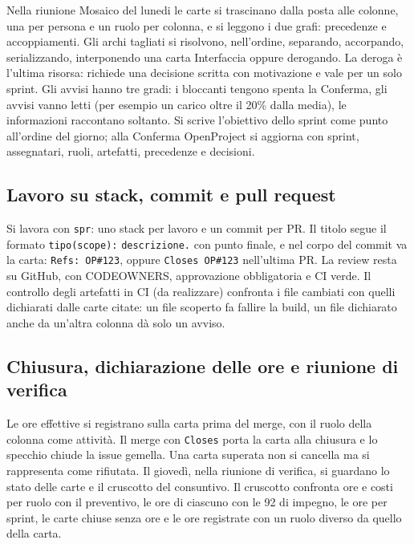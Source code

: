 \documentclass[a4paper, 11pt]{article}
\begin{document}
Nella riunione Mosaico del lunedi le carte si trascinano dalla posta alle colonne, una per persona e un ruolo per colonna, e si leggono i due grafi: precedenze e accoppiamenti. Gli archi tagliati si risolvono, nell'ordine, separando, accorpando, serializzando, interponendo una carta Interfaccia oppure derogando. La deroga \`e l'ultima risorsa: richiede una decisione scritta con motivazione e vale per un solo sprint.
\newline \newline
Gli avvisi hanno tre gradi: i bloccanti tengono spenta la Conferma, gli avvisi vanno letti (per esempio un carico oltre il 20\% dalla media), le informazioni raccontano soltanto. Si scrive l'obiettivo dello sprint come punto all'ordine del giorno; alla Conferma OpenProject si aggiorna con sprint, assegnatari, ruoli, artefatti, precedenze e decisioni.

\subsection{Lavoro su stack, commit e pull request}

Si lavora con \texttt{spr}: uno stack per lavoro e un commit per PR. Il titolo segue il formato \texttt{tipo(scope):} \texttt{descrizione.} con punto finale, e nel corpo del commit va la carta: \texttt{Refs: OP\#123}, oppure \texttt{Closes OP\#123} nell'ultima PR. La review resta su GitHub, con CODEOWNERS, approvazione obbligatoria e CI verde.
\newline
Il controllo degli artefatti in CI (da realizzare) confronta i file cambiati con quelli dichiarati dalle carte citate: un file scoperto fa fallire la build, un file dichiarato anche da un'altra colonna d\`a solo un avviso.

\subsection{Chiusura, dichiarazione delle ore e riunione di verifica}

Le ore effettive si registrano sulla carta prima del merge, con il ruolo della colonna come attivit\`a. Il merge con \texttt{Closes} porta la carta alla chiusura e lo specchio chiude la issue gemella. Una carta superata non si cancella ma si rappresenta come rifiutata.
\newline \newline
Il gioved\`i, nella riunione di verifica, si guardano lo stato delle carte e il cruscotto del consuntivo. 
Il cruscotto confronta ore e costi per ruolo con il preventivo, le ore di ciascuno con le 92 di impegno, le ore per sprint, le carte chiuse senza ore e le ore registrate con un ruolo diverso da quello della carta.
\end{document}
